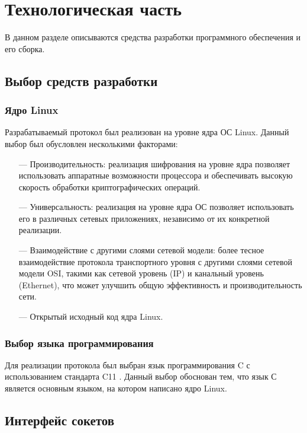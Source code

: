 \section{Технологическая часть}

В данном разделе описываются средства разработки программного обеспечения и его сборка.

\subsection{Выбор средств разработки}

\subsubsection{Ядро Linux}

Разрабатываемый протокол был реализован на уровне ядра ОС Linux. Данный выбор был обусловлен несколькими факторами:

\begin{itemize}
	\item [---] Производительность: реализация шифрования на уровне ядра позволяет использовать аппаратные возможности процессора и обеспечивать высокую скорость обработки криптографических операций.
	\item [---] Универсальность: реализация на уровне ядра ОС позволяет использовать его в различных сетевых приложениях, независимо от их конкретной реализации.
	\item [---] Взаимодействие с другими слоями сетевой модели: более тесное взаимодействие протокола транспортного уровня с другими слоями сетевой модели OSI, такими как сетевой уровень (IP) и канальный уровень (Ethernet), что может улучшить общую эффективность и производительность сети.
	\item [---] Открытый исходный код ядра Linux.
\end{itemize}

\subsubsection{Выбор языка программирования}
Для реализации протокола был выбран язык программирования C с использованием стандарта C11 \cite{C11}. Данный выбор обоснован тем, что язык С является основным языком, на котором написано ядро Linux.

\subsection{Интерфейс сокетов}

